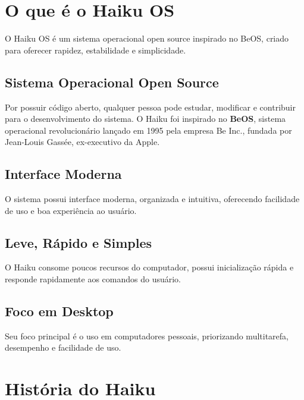 \documentclass[12pt,a4paper]{article}
\begin{document}

\section{O que é o Haiku OS}

O Haiku OS é um sistema operacional open source inspirado no BeOS, criado para oferecer rapidez, estabilidade e simplicidade.

\subsection{Sistema Operacional Open Source}

Por possuir código aberto, qualquer pessoa pode estudar, modificar e contribuir para o desenvolvimento do sistema.
O Haiku foi inspirado no \textbf{BeOS}, sistema operacional revolucionário lançado em 1995 pela empresa Be Inc., fundada por Jean-Louis Gassée, ex-executivo da Apple.

\subsection{Interface Moderna}

O sistema possui interface moderna, organizada e intuitiva, oferecendo facilidade de uso e boa experiência ao usuário.

\subsection{Leve, Rápido e Simples}

O Haiku consome poucos recursos do computador, possui inicialização rápida e responde rapidamente aos comandos do usuário.

\subsection{Foco em Desktop}

Seu foco principal é o uso em computadores pessoais, priorizando multitarefa, desempenho e facilidade de uso.


\section{História do Haiku}
\end{document}
